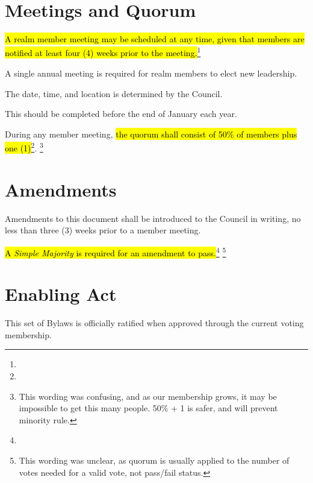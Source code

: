 \documentclass[12pt]{article}
\newcommand{\newpart}[2][]{\hl{#2}\expandafter\ifx\expandafter\relax\detokenize{#1}\relax\else\textnormal{\footnote{#1}}\fi}
\begin{document}
\section{Meetings and Quorum}\label{annual_meeting}
\begin{level} 
    \item \newpart{A realm member meeting may be scheduled at any time, given that members are notified at least four (4) weeks prior to the meeting.}
    \item A single annual meeting is required for realm members to elect new leadership. 
    \begin{level}
        \item The date, time, and location is determined by the Council. 
        \item This should be completed before the end of January each year.
    \end{level}
    \item During any member meeting, \newpart[]{the quorum shall consist of 50\% of members plus one (1)}. \footnote{This wording was confusing, and as our membership grows, it may be impossible to get this many people. 50\% + 1 is safer, and will prevent minority rule.}
\end{level}

\section{Amendments}\label{amendments}
\begin{level} 
    \item Amendments to this document shall be introduced to the Council in writing, no less than three (3) weeks prior to a member meeting. 
    \item \newpart{A \emph{Simple Majority} is required for an amendment to pass.} \footnote{This wording was unclear, as quorum is usually applied to the number of votes needed for a valid vote, not pass/fail status.}
\end{level}

\section{Enabling Act}
\begin{level} 
    \item This set of Bylaws is officially ratified when approved through the current voting membership.
\end{level}

\end{document}
